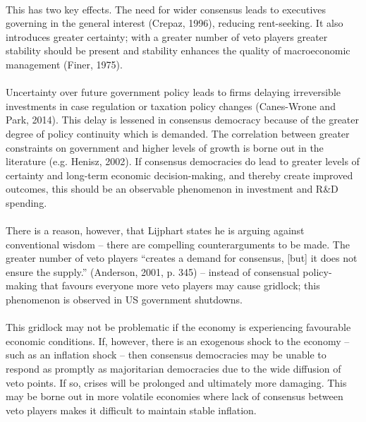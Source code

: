 \documentclass[11pt, oneside]{article}   	%
\let\oldparagraph\paragraph
\renewcommand{\paragraph}[1]{\oldparagraph{#1}\mbox{}}
\begin{document}
\paragraph{}
This has two key effects. The need for wider consensus leads to executives governing in the general interest (Crepaz, 1996), reducing rent-seeking. It also introduces greater certainty; with a greater number of veto players greater stability should be present and stability enhances the quality of macroeconomic management (Finer, 1975). 

\paragraph{}
Uncertainty over future government policy leads to firms delaying irreversible investments in case regulation or taxation policy changes (Canes-Wrone and Park, 2014). This delay is lessened in consensus democracy because of the greater degree of policy continuity which is demanded. The correlation between greater constraints on government and higher levels of growth is borne out in the literature (e.g. Henisz, 2002). If consensus democracies do lead to greater levels of certainty and long-term economic decision-making, and thereby create improved outcomes, this should be an observable phenomenon in investment and R\&D spending.

\paragraph{}
There is a reason, however, that Lijphart states he is arguing against conventional wisdom – there are compelling counterarguments to be made. The greater number of veto players “creates a demand for consensus, [but] it does not ensure the supply.” (Anderson, 2001, p. 345) – instead of consensual policy-making that favours everyone more veto players may cause gridlock; this phenomenon is observed in US government shutdowns.

\paragraph{}
This gridlock may not be problematic if the economy is experiencing favourable economic conditions. If, however, there is an exogenous shock to the economy – such as an inflation shock – then consensus democracies may be unable to respond as promptly as majoritarian democracies due to the wide diffusion of veto points. If so, crises will be prolonged and ultimately more damaging. This may be borne out in more volatile economies where lack of consensus between veto players makes it difficult to maintain stable inflation.
\end{document}

